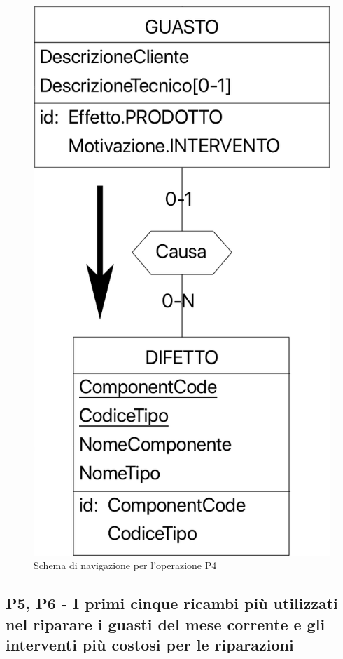\documentclass[a4paper, 12pt]{report}
\begin{document}
\begin{figure}[H]
	\centering
	\includegraphics{images/P4.png}
	\caption{Schema di navigazione per l'operazione P4}
\end{figure}

\subsection{P5, P6 - I primi cinque ricambi più utilizzati nel riparare i guasti del mese corrente e gli interventi più costosi per le riparazioni}
\end{document}
